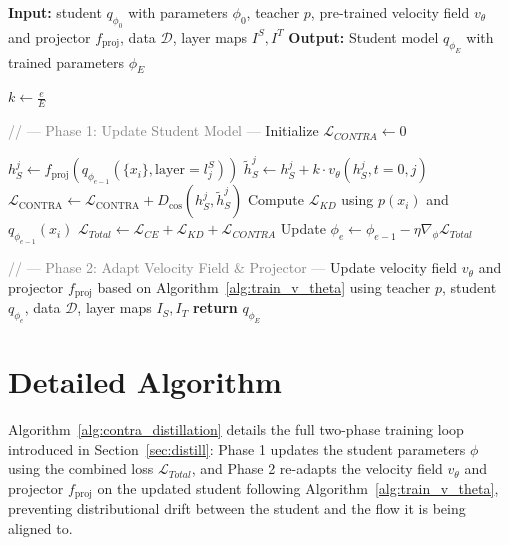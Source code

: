 \documentclass{article} %
\theoremstyle{definition}
\theoremstyle{remark}
\begin{document}
\begin{algorithm}[t]
  \caption{CONTRA-KD Distillation}
  \label{alg:contra_distillation}
  \begin{algorithmic}[1]
    \STATE \textbf{Input:} student $q_{\phi_0}$ with parameters $\phi_0$, teacher $p$, pre-trained velocity field $v_\theta$ and projector $f_{\text{proj}}$, data $\mathcal{D}$, layer maps $I^S, I^T$
    \STATE \textbf{Output:} Student model $q_{\phi_E}$ with trained parameters $\phi_E$
    
    \STATE $k \gets \frac{e}{E}$

      \STATE \textcolor{gray}{// --- Phase 1: Update Student Model ---}
      \STATE Initialize $\mathcal{L}_{CONTRA} \gets 0$

        \STATE $h_S^j \gets f_{\text{proj}}\!\left(q_{\phi_{e-1}}(\{x_i\}, \text{layer}=l_j^S)\right)$ 
        \STATE $\tilde{h}_S^j \gets h_S^j + k \cdot v_\theta(h_S^j, t=0, j)$
        \STATE $\mathcal{L}_{\text{CONTRA}} \gets \mathcal{L}_{\text{CONTRA}} + D_{\text{cos}}(h_S^j, \tilde{h}_S^j)$
      \ENDFOR
      \STATE Compute $\mathcal{L}_{KD}$ using $p(x_i)$ and $q_{\phi_{e-1}}(x_i)$
      \STATE $\mathcal{L}_{Total} \gets \mathcal{L}_{CE} + \mathcal{L}_{KD} + \mathcal{L}_{CONTRA}$
      \STATE Update $\phi_{e} \gets \phi_{e-1} - \eta \nabla_\phi \mathcal{L}_{Total}$

    \ENDFOR
    \STATE \textcolor{gray}{// --- Phase 2: Adapt Velocity Field \& Projector ---}
    \STATE Update velocity field $v_\theta$ and projector $f_{\text{proj}}$ based on Algorithm~\ref{alg:train_v_theta} using teacher $p$, student $q_{\phi_{e}}$, data $\mathcal{D}$, layer maps $I_S, I_T$
    \ENDFOR
    \STATE \textbf{return} $q_{\phi_{E}}$
  \end{algorithmic}
\end{algorithm}

\section{Detailed Algorithm}
\label{app:contra_algo}

Algorithm~\ref{alg:contra_distillation} details the full two-phase training loop introduced in Section~\ref{sec:distill}: Phase 1 updates the student parameters $\phi$ using the combined loss $\mathcal{L}_{Total}$, and Phase 2 re-adapts the velocity field $v_\theta$ and projector $f_{\text{proj}}$ on the updated student following Algorithm~\ref{alg:train_v_theta}, preventing distributional drift between the student and the flow it is being aligned to.
\end{document}
